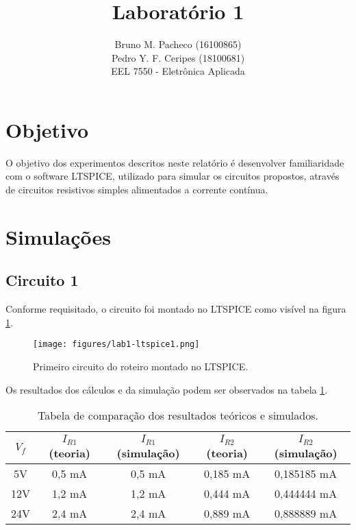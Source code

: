 \documentclass[a4paper]{report}
\begin{document}
 
\title{Laboratório 1}
\author{Bruno M. Pacheco (16100865)\\
Pedro Y. F. Ceripes (18100681) \\
EEL 7550 - Eletrônica Aplicada}
 
\maketitle

\section*{Objetivo}
 
O objetivo dos experimentos descritos neste relatório é desenvolver familiaridade com o software LTSPICE, utilizado para simular os circuitos propostos, através de circuitos resistivos simples alimentados a corrente contínua.
 
\section*{Simulações}

\subsection*{Circuito 1}

Conforme requisitado, o circuito foi montado no LTSPICE como visível na figura \ref{fig:ltspice-1}.

\begin{figure}[h]
    \centering
    \texttt{[image: figures/lab1-ltspice1.png]}
    \caption{Primeiro circuito do roteiro montado no LTSPICE.}
    \label{fig:ltspice-1}
\end{figure}

Os resultados dos cálculos e da simulação podem ser observados na tabela \ref{tab:circ-1}.

\begin{table}[h]
    \centering
    \caption{Tabela de comparação dos resultados teóricos e simulados.}
    \label{tab:circ-1}
    \begin{tabular}{c | c | c | c | c}
	$V_f$ & $I_{R1}$ (teoria) & $I_{R1}$ (simulação) & $I_{R2}$ (teoria) & $I_{R2}$ (simulação)  \\
	\hline
	5V & 0,5 mA & 0,5 mA & 0,185 mA & 0,185185 mA \\
	12V & 1,2 mA & 1,2 mA & 0,444 mA & 0,444444 mA \\
	24V & 2,4 mA & 2,4 mA & 0,889 mA & 0,888889 mA
    \end{tabular}
\end{table}
\end{document}
